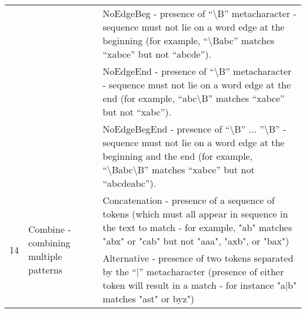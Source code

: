 \documentclass[a4paper,12pt]{article}
\newcommand{\mrt}[2]{\multirow{#1}{6cm}{#2}}
\newcommand{\mrn}[2]{\multirow{#1}{*}{#2}}
\begin{document}
\begin{longtable}{|l|p{6cm}|p{6cm}|}
                      && NoEdgeBeg - presence of ``\textbackslash B'' metacharacter - sequence must not lie on a word edge at the beginning (for example, ``\textbackslash Babc'' matches ``xabce'' but not ``abcde'').    \\ \cline{3-3}
                      && NoEdgeEnd - presence of ``\textbackslash B'' metacharacter  - sequence must not lie on a word edge at the end (for example, ``abc\textbackslash B'' matches ``xabce'' but not ``xabc'').    \\ \cline{3-3}
                      && NoEdgeBegEnd - presence of ``\textbackslash B'' ... ''\textbackslash B'' - sequence must not lie on a word edge at the beginning and the end (for example, ``\textbackslash Babc\textbackslash B'' matches ``xabce'' but not ``abcdeabc''). \\ \hline 
\mrn{2}{14} & \mrt{2}{Combine - combining multiple patterns} & Concatenation - presence of a sequence of tokens (which must all appear in sequence in the text to match - for example, "ab" matches "abx" or "cab" but not "aaa", "axb", or "bax")  \\ \cline{3-3}
                      && Alternative - presence of two tokens separated by the ``$|$'' metacharacter (presence of either token will result in a match - for instance "a$|$b" matches "ast" or byz")  \\ \hline
\end{longtable}
\end{document}

